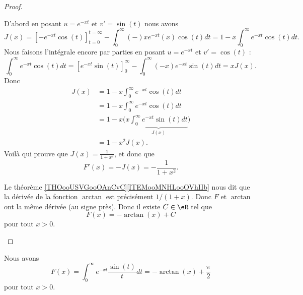 \begin{proof}
\begin{subproof}
		D'abord en posant \( u= e^{-xt}\) et \( v'=\sin(t)\) nous avons
		\begin{equation}
			J(x)=\left[ - e^{-xt}\cos(t) \right]_{t=0}^{t=\infty}-\int_0^{\infty}(-)x e^{-xt}(x)\cos(t)dt=1-x\int_0^{\infty} e^{-xt}\cos(t)dt.
		\end{equation}
		Nous faisons l'intégrale encore par parties en posant \( u= e^{-xt}\) et \( v'=\cos(t)\) :
		\begin{equation}
			\int_0^{\infty} e^{-xt}\cos(t)dt=\left[  e^{-xt}\sin(t) \right]_0^{\infty}-\int_0^{\infty}(-x) e^{-xt}\sin(t)dt=xJ(x).
		\end{equation}
		Donc
		\begin{subequations}
			\begin{align}
				J(x) & =1-x\int_0^{\infty} e^{-xt}\cos(t)dt                                  \\
				     & =1-x\int_0^{\infty} e^{-xt}\cos(t)dt                                  \\
				     & =1-x\Big( x\underbrace{\int_0^{\infty} e^{-xt}\sin(t)dt}_{J(x)} \Big) \\
				     & =1-x^2J(x).
			\end{align}
		\end{subequations}
		Voilà qui prouve que \( J(x)=\frac{1}{ 1+x^2 }\), et donc que
		\begin{equation}
			F'(x)=-J(x)=-\frac{1}{ 1+x^2 }.
		\end{equation}

		\spitem[Et enfin]

		Le théorème \ref{THOooUSVGooOAnCvC}\ref{ITEMooMNHLooOVhIIb} nous dit que la dérivée de la fonction \( \arctan\) est précisément \( 1/(1+x)\). Donc \( F\) et \( \arctan\) ont la même dérivée (au signe près). Donc il existe \( C\in \eR\) tel que
		\begin{equation}
			F(x)=-\arctan(x)+C
		\end{equation}
		pour tout \( x>0\).

	\end{subproof}
\end{proof}

\begin{lemma}       \label{LEMooEOYHooVIMCCa}
	Nous avons
	\begin{equation}
		F(x)=\int_0^{\infty} e^{-xt}\frac{ \sin(t) }{ t }dt=-\arctan(x)+\frac{ \pi }{2}
	\end{equation}
	pour tout \( x>0\).
\end{lemma}

